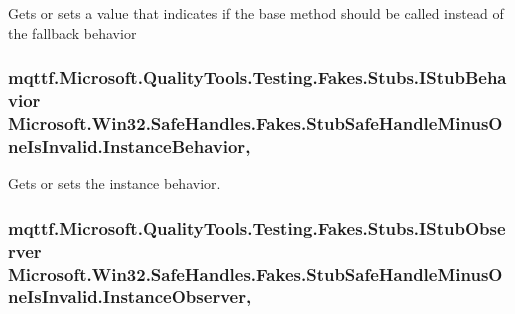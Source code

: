 Gets or sets a value that indicates if the base method should be called instead of the fallback behavior

\hypertarget{class_microsoft_1_1_win32_1_1_safe_handles_1_1_fakes_1_1_stub_safe_handle_minus_one_is_invalid_a915a0d45a9d34d6aac5a47a2fc04cbcf}{
\subsubsection[{Instance\-Behavior}]{\setlength{\rightskip}{0pt plus 5cm}mqttf.\-Microsoft.\-Quality\-Tools.\-Testing.\-Fakes.\-Stubs.\-I\-Stub\-Behavior Microsoft.\-Win32.\-Safe\-Handles.\-Fakes.\-Stub\-Safe\-Handle\-Minus\-One\-Is\-Invalid.\-Instance\-Behavior\hspace{0.3cm}{\ttfamily [get]}, {\ttfamily [set]}}}\label{class_microsoft_1_1_win32_1_1_safe_handles_1_1_fakes_1_1_stub_safe_handle_minus_one_is_invalid_a915a0d45a9d34d6aac5a47a2fc04cbcf}


Gets or sets the instance behavior.

\hypertarget{class_microsoft_1_1_win32_1_1_safe_handles_1_1_fakes_1_1_stub_safe_handle_minus_one_is_invalid_a5c4b42f36760bb2e4ac0e5114717591e}{
\subsubsection[{Instance\-Observer}]{\setlength{\rightskip}{0pt plus 5cm}mqttf.\-Microsoft.\-Quality\-Tools.\-Testing.\-Fakes.\-Stubs.\-I\-Stub\-Observer Microsoft.\-Win32.\-Safe\-Handles.\-Fakes.\-Stub\-Safe\-Handle\-Minus\-One\-Is\-Invalid.\-Instance\-Observer\hspace{0.3cm}{\ttfamily [get]}, {\ttfamily [set]}}}\label{class_microsoft_1_1_win32_1_1_safe_handles_1_1_fakes_1_1_stub_safe_handle_minus_one_is_invalid_a5c4b42f36760bb2e4ac0e5114717591e}


